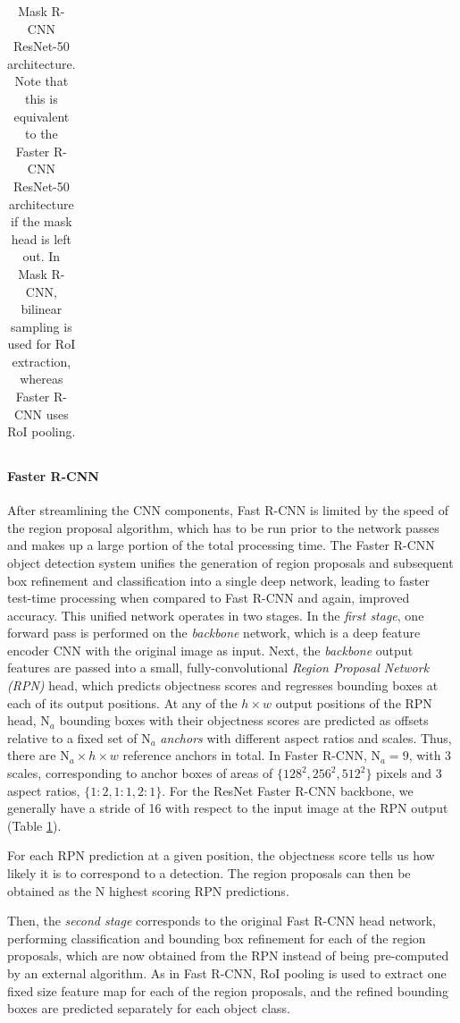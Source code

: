 {\begin{table}[t]
\begin{tabular}{llr}
\bottomrule
\end{tabular}
\caption {
Mask R-CNN \cite{MaskRCNN} ResNet-50 \cite{ResNet} architecture.
Note that this is equivalent to the Faster R-CNN ResNet-50 architecture if the mask
head is left out. In Mask R-CNN, bilinear sampling is used for RoI extraction,
whereas Faster R-CNN uses RoI pooling.
}
\label{table:maskrcnn_resnet}
\end{table}
}


\paragraph{Faster R-CNN}
After streamlining the CNN components, Fast R-CNN is limited by the speed of the region proposal
algorithm, which has to be run prior to the network passes and makes up a large portion of the total
processing time.
The Faster R-CNN object detection system \cite{FasterRCNN} unifies the generation of region proposals and subsequent box refinement and
classification into a single deep network, leading to faster test-time processing when compared to Fast R-CNN
and again, improved accuracy.
This unified network operates in two stages.
In the \emph{first stage}, one forward pass is performed on the \emph{backbone} network,
which is a deep feature encoder CNN with the original image as input.
Next, the \emph{backbone} output features are passed into a small, fully-convolutional \emph{Region Proposal Network (RPN)} head, which
predicts objectness scores and regresses bounding boxes at each of its output positions.
At any of the $h \times w$ output positions of the RPN head,
$\text{N}_a$ bounding boxes with their objectness scores are predicted as offsets relative to a fixed set of $\text{N}_a$ \emph{anchors} with different
aspect ratios and scales. Thus, there are $\text{N}_a \times h \times w$ reference anchors in total.
In Faster R-CNN, $\text{N}_a = 9$, with 3 scales, corresponding
to anchor boxes of areas of $\{128^2, 256^2, 512^2\}$ pixels and 3 aspect ratios,
$\{1:2, 1:1, 2:1\}$. For the ResNet Faster R-CNN backbone, we generally have a stride of 16
with respect to the input image at the RPN output (Table \ref{table:maskrcnn_resnet}).

For each RPN prediction at a given position, the objectness score tells us how likely it is to correspond to a detection.
The region proposals can then be obtained as the N highest scoring RPN predictions.

Then, the \emph{second stage} corresponds to the original Fast R-CNN head network, performing classification
and bounding box refinement for each of the region proposals, which are now obtained
from the RPN instead of being pre-computed by an external algorithm.
As in Fast R-CNN, RoI pooling is used to extract one fixed size feature map for each of the region proposals,
and the refined bounding boxes are predicted separately for each object class.

